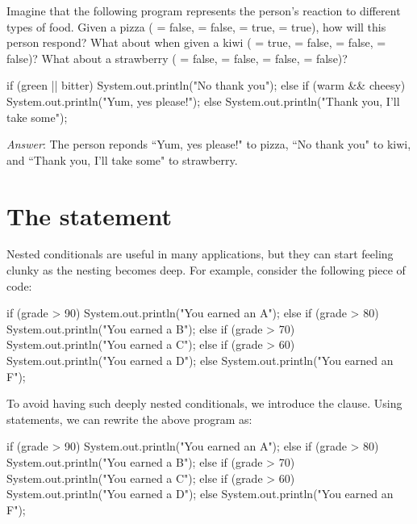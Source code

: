 \begin{example}
Imagine that the following program represents the person's reaction to different types of food. Given a pizza ( = false,  = false,  = true,  = true), how will this person respond? What about when given a kiwi ( = true,  = false,  = false,  = false)? What about a strawberry ( = false,  = false,  = false,  = false)?

\begin{code}
if (green || bitter) {
    System.out.println("No thank you");
} else {
    if (warm && cheesy) {
        System.out.println("Yum, yes please!");
    } else {
        System.out.println("Thank you, I'll take some");
    }
}
\end{code}
\emph{Answer}: The person reponds ``Yum, yes please!" to pizza, ``No thank you" to kiwi, and ``Thank you, I'll take some" to strawberry.
\end{example}

\section{The  statement}
Nested conditionals are useful in many applications, but they can start feeling clunky as the nesting becomes deep. For example, consider the following piece of code:

\begin{code}
if (grade > 90) {
    System.out.println("You earned an A");
} else {
    if (grade > 80) {
        System.out.println("You earned a B");
    } else {
        if (grade > 70) {
            System.out.println("You earned a C");
        } else {
            if (grade > 60) {
                System.out.println("You earned a D");
            } else {
                System.out.println("You earned an F");
            }
        }
    }
}
\end{code}

\noindent To avoid having such deeply nested conditionals, we introduce the  clause. Using  statements, we can rewrite the above program as:

\begin{code}
if (grade > 90) {
    System.out.println("You earned an A");
} else if (grade > 80) {
    System.out.println("You earned a B");
} else if (grade > 70) {
    System.out.println("You earned a C");
} else if (grade > 60) {
    System.out.println("You earned a D");
} else {
    System.out.println("You earned an F");
}
\end{code}

